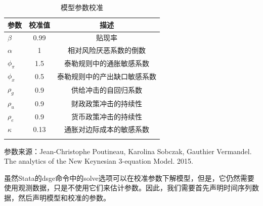 \documentclass[cn,12pt,math=newtx,citestyle=gb7714-2015,bibstyle=gb7714-2015]{elegantbook}
\begin{document}
\begin{table}[htbp]\centering
	\scriptsize
	\caption{模型参数校准}
	\label{param}
	\begin{center}
		\begin{threeparttable}
			\begin{tabular}{l*{2}{c}}
				\toprule
				\multicolumn{1}{l}{\textbf{参数}}&
				\multicolumn{1}{c}{\textbf{校准值}}&
				\multicolumn{1}{c}{描述} \\
				\midrule
				$\beta$ &0.99&贴现率\\
				$\alpha$              &      1 &相对风险厌恶系数的倒数      \\
				$\phi_\pi$ &   1.5   &    泰勒规则中的通胀敏感系数   \\
				$\phi_x$        &     0.5 &泰勒规则中的产出缺口敏感系数      \\
				$\rho_g$ & 0.9 & 供给冲击的自回归系数  \\
				$\rho_u$ & 0.9 & 财政政策冲击的持续性  \\
				$\rho_e$ & 0.9 & 货币政策冲击的持续性  \\
				$\kappa$ & 0.13 & 通胀对边际成本的敏感系数  \\
				
				\\
				\bottomrule
			\end{tabular}
			\begin{tablenotes}
				\tiny
				\item 参数来源：Jean-Christophe Poutineau, Karolina Sobczak, Gauthier Vermandel. The analytics of the New Keynesian 3-equation Model. 2015.
			\end{tablenotes}
		\end{threeparttable}
	\end{center}
\end{table}
	
	虽然Stata的dsge命令中的solve选项可以在校准参数下解模型，但是，它仍然需要使用观测数据，只是不使用它们来估计参数。因此，我们需要首先声明时间序列数据，然后声明模型和校准的参数。
\end{document}
